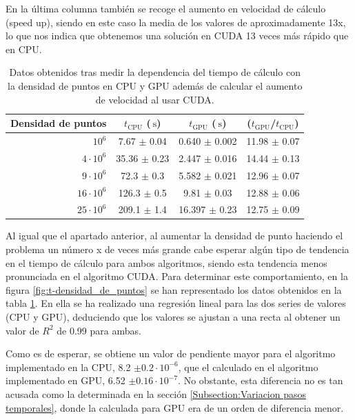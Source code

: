 \documentclass[11pt,a4paper,twoside,pdf]{article}
\numberwithin{equation}{section}
\begin{document}
En la última columna también se recoge el aumento en velocidad de cálculo (speed up), siendo en este caso la media de los valores de aproximadamente 13x, lo que nos indica que obtenemos una solución en CUDA 13 veces más rápido que en CPU.

\begin{table}[h]
    \centering
    \begin{tabular}{|r|c|c|c|}
    \hline
    Densidad de puntos &  $t_\text{CPU}$ ($\SI{}{\second}$)  & $t_\text{GPU}$ ($\SI{}{\second}$) &  ($t_\text{GPU}$/$t_\text{CPU}$)  \\ \hline \hline
     $10^6$ & 7.67 $\pm$ 0.04         & 0.640 $\pm$ 0.002 & 11.98 $\pm$ 0.07\\ \hline
     $4\cdot 10^6$ & 35.36 $\pm$ 0.23 & 2.447 $\pm$ 0.016 & 14.44 $\pm$ 0.13\\ \hline
     $9\cdot 10^6$ & 72.3 $\pm$ 0.3   & 5.582 $\pm$ 0.021   & 12.96 $\pm$ 0.07\\ \hline
     $16\cdot 10^6$ & 126.3 $\pm$ 0.5 & 9.81 $\pm$ 0.03   & 12.88 $\pm$ 0.06\\ \hline
     $25\cdot 10^6$ & 209.1 $\pm$ 1.4 & 16.397 $\pm$ 0.23 & 12.75 $\pm$ 0.09\\ \hline
    \end{tabular}
    \caption{Datos obtenidos tras medir la dependencia del tiempo de cálculo con la densidad de puntos en CPU y GPU además de calcular el aumento de velocidad al usar CUDA.}
    \label{tab:t_densidad_de_punto}
\end{table}


Al igual que el apartado anterior, al aumentar la densidad de punto haciendo el problema un número x de veces más grande cabe esperar algún tipo de tendencia en el tiempo de cálculo para ambos algoritmos, siendo esta tendencia menos pronunciada en el algoritmo CUDA. Para determinar este comportamiento, en la figura \ref{fig:t-densidad_de_puntos} se han representado los datos obtenidos en la tabla \ref{tab:t_densidad_de_punto}. En ella se ha realizado una regresión lineal para las dos series de valores (CPU y GPU), deduciendo que los valores se ajustan a una recta al obtener un valor de $R^2$ de 0.99 para ambas. 

Como es de esperar, se obtiene un valor de pendiente mayor para el algoritmo implementado en la CPU, 8.2 $\pm 0.2 \cdot 10^{-6}$, que el calculado en el algoritmo implementado en GPU, 6.52 $\pm 0.16 \cdot 10^{-7}$. No obstante, esta diferencia no es tan acusada como la determinada en la sección \ref{Subsection:Variacion pasos temporales}, donde la calculada para GPU era de un orden de diferencia menor.
\end{document}
